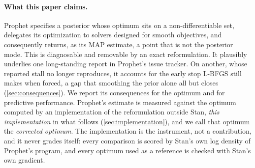 \paragraph{What this paper claims.}
Prophet specifies a posterior whose optimum sits on a non-differentiable set,
delegates its optimization to solvers designed for smooth objectives, and
consequently returns, as its MAP estimate, a point that is not the posterior mode. This is diagnosable and
removable by an exact reformulation. It plausibly underlies one long-standing report in
Prophet's issue tracker. On another, whose reported stall no longer reproduces, it
accounts for the early stop L-BFGS still makes when forced, a gap that smoothing the
prior alone all but closes (\cref{sec:consequences}). We report its consequences for
the optimum and for predictive performance. Prophet's estimate is measured against the optimum computed
by an implementation of the reformulation outside Stan, \emph{this implementation} in
what follows (\cref{sec:implementation}), and we call that optimum the
\emph{corrected optimum}. The implementation is the instrument, not a contribution,
and it never grades itself: every comparison is scored by Stan's own log density of
Prophet's program, and every optimum used as a reference is checked with Stan's own
gradient.

